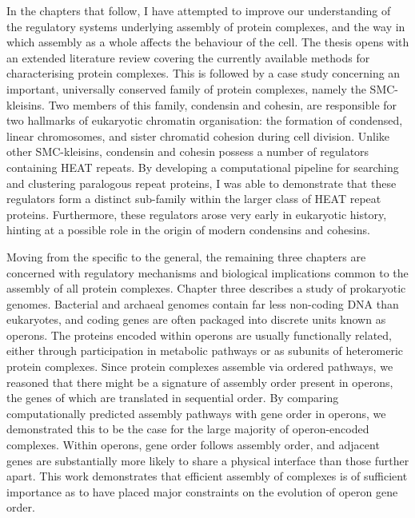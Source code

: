 \documentclass[a4paper,11pt,twoside,openright]{scrbook}
\begin{document}
In the chapters that follow, I have attempted to improve our understanding of the regulatory systems underlying assembly of protein complexes, and the way in which assembly as a whole affects the behaviour of the cell. The thesis opens with an extended literature review covering the currently available methods for characterising protein complexes. This is followed by a case study concerning an important, universally conserved family of protein complexes, namely the SMC-kleisins. Two members of this family, condensin and cohesin, are responsible for two hallmarks of eukaryotic chromatin organisation: the formation of condensed, linear chromosomes, and sister chromatid cohesion during cell division. Unlike other SMC-kleisins, condensin and cohesin possess a number of regulators containing HEAT repeats. By developing a computational pipeline for searching and clustering paralogous repeat proteins, I was able to demonstrate that these regulators form a distinct sub-family within the larger class of HEAT repeat proteins. Furthermore, these regulators arose very early in eukaryotic history, hinting at a possible role in the origin of modern condensins and cohesins.

Moving from the specific to the general, the remaining three chapters are concerned with regulatory mechanisms and biological implications common to the assembly of all protein complexes. Chapter three describes a study of prokaryotic genomes. Bacterial and archaeal genomes contain far less non-coding DNA than eukaryotes, and coding genes are often packaged into discrete units known as operons. The proteins encoded within operons are usually functionally related, either through participation in metabolic pathways or as subunits of heteromeric protein complexes. Since protein complexes assemble via ordered pathways, we reasoned that there might be a signature of assembly order present in operons, the genes of which are translated in sequential order. By comparing computationally predicted assembly pathways with gene order in operons, we demonstrated this to be the case for the large majority of operon-encoded complexes. Within operons, gene order follows assembly order, and adjacent genes are substantially more likely to share a physical interface than those further apart. This work demonstrates that efficient assembly of complexes is of sufficient importance as to have placed major constraints on the evolution of operon gene order.
\end{document}
